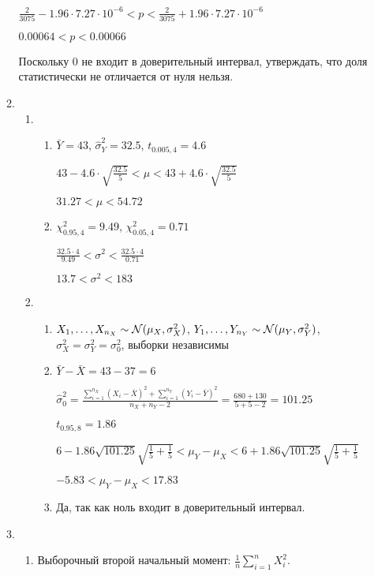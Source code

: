 \begin{enumerate}[resume]
\begin{enumerate}
$\frac{2}{3075} - 1.96 \cdot 7.27 \cdot 10^{-6} < p < \frac{2}{3075} + 1.96 \cdot 7.27 \cdot 10^{-6}$

$0.00064 < p < 0.00066$

Поскольку $0$ не входит в доверительный интервал, утверждать, что доля статистически
не отличается от нуля нельзя.

\item
\begin{enumerate}
  \item
  \begin{enumerate}
    \item $\bar{Y} = 43$, $\hat{\sigma}_Y^2 = 32.5$, $t_{0.005, 4} = 4.6$

    $43 - 4.6 \cdot \sqrt{\frac{32.5}{5}} < \mu < 43 + 4.6 \cdot \sqrt{\frac{32.5}{5}}$

    $31.27 < \mu < 54.72$

    \item $\chi^2_{0.95, 4} = 9.49$, $\chi^2_{0.05, 4} = 0.71$

    $\frac{32.5 \cdot 4}{9.49} < \sigma^2 < \frac{32.5 \cdot 4}{0.71}$

    $13.7 < \sigma^2 < 183$
  \end{enumerate}
  \item
  \begin{enumerate}
  \item
  $X_1, \ldots, X_{n_X} \sim \mathcal{N}(\mu_X, \sigma^2_X)$, $Y_1, \ldots, Y_{n_Y} \sim \mathcal{N}(\mu_Y, \sigma^2_Y)$,
  $\sigma^2_X = \sigma^2_Y = \sigma^2_0$, выборки независимы

  \item $\bar{Y} - \bar{X} = 43 - 37 = 6$

  $\hat{\sigma}^2_0 = \frac{\sum_{i=1}^{n_X} (X_i - \bar X)^2 + \sum_{i=1}^{n_Y} (Y_i - \bar Y)^2}{n_X + n_Y - 2} = \frac{680+130}{5+5-2} = 101.25$

  $t_{0.95, 8} = 1.86$

  $6 - 1.86 \sqrt{101.25} \sqrt{\frac{1}{5} + \frac{1}{5}} < \mu_Y - \mu_X <  6 + 1.86 \sqrt{101.25} \sqrt{\frac{1}{5} + \frac{1}{5}} $

  $-5.83 < \mu_Y - \mu_X < 17.83$
  \item Да, так как ноль входит в доверительный интервал.
  \end{enumerate}
\end{enumerate}
\item
\begin{enumerate}
  \item Выборочный второй начальный момент: $\frac{1}{n} \sum_{i=1}^n X_i^2$.


\end{enumerate}
\end{enumerate}
\end{enumerate}
